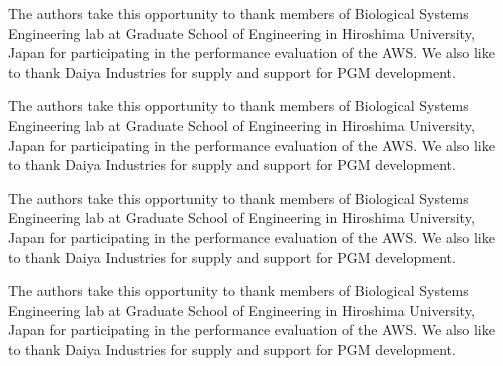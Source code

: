 \documentclass[letterpaper, 10 pt, conference]{ieeeconf}  %
\begin{document}
The authors take this opportunity to thank members of Biological Systems Engineering lab at Graduate School of Engineering in Hiroshima University, Japan for participating in the performance evaluation of the AWS. We also like to thank Daiya Industries for supply and support for PGM development. 

The authors take this opportunity to thank members of Biological Systems Engineering lab at Graduate School of Engineering in Hiroshima University, Japan for participating in the performance evaluation of the AWS. We also like to thank Daiya Industries for supply and support for PGM development. 

The authors take this opportunity to thank members of Biological Systems Engineering lab at Graduate School of Engineering in Hiroshima University, Japan for participating in the performance evaluation of the AWS. We also like to thank Daiya Industries for supply and support for PGM development. 

The authors take this opportunity to thank members of Biological Systems Engineering lab at Graduate School of Engineering in Hiroshima University, Japan for participating in the performance evaluation of the AWS. We also like to thank Daiya Industries for supply and support for PGM development. 
\end{document}
